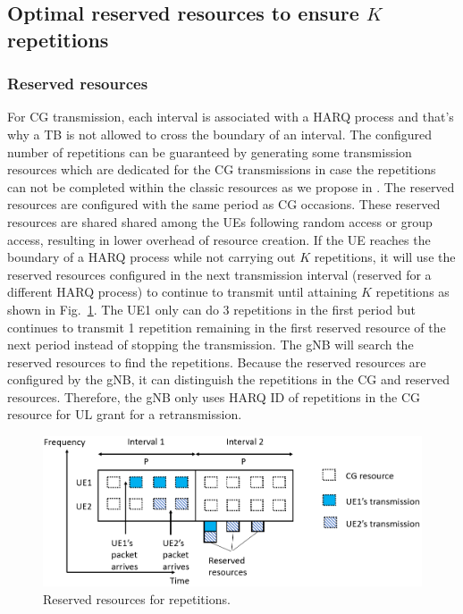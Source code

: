 \documentclass{ieeeaccess}
\begin{document}
\subsection{Optimal reserved resources to ensure $K$ repetitions}\label{IIIB}

\subsubsection {Reserved resources}

For CG transmission, each interval is associated with a HARQ process and that's why a TB is not allowed to cross the boundary of an interval. The configured number of repetitions can be guaranteed by generating some transmission resources which are dedicated for the CG transmissions in case the repetitions can not be completed within the classic resources as we propose in \cite{b9}. The reserved resources are configured with the same period as CG occasions. These reserved resources are shared shared among the UEs following random access or group access, resulting in lower overhead of resource creation. If the UE reaches the boundary of a HARQ process while not carrying out $K$ repetitions, it will use the reserved resources configured in the next transmission interval (reserved for a different HARQ process) to continue to transmit until attaining $K$ repetitions as shown in Fig.~\ref{fig5}. The UE1 only can do 3 repetitions in the first period but continues to transmit 1 repetition remaining in the first reserved resource of the next period instead of stopping the transmission. The gNB will search the reserved resources to find the repetitions. Because the reserved resources are configured by the gNB, it can distinguish the repetitions in the CG and reserved resources. Therefore, the gNB only uses HARQ ID of repetitions in the CG resource for UL grant for a retransmission.

\begin{figure}[htbp]
\centerline{\includegraphics[scale=0.32]{fig5.PNG}}
\caption{Reserved resources for repetitions.}
\label{fig5}
\vspace{-2mm}
\end{figure}
\end{document}
